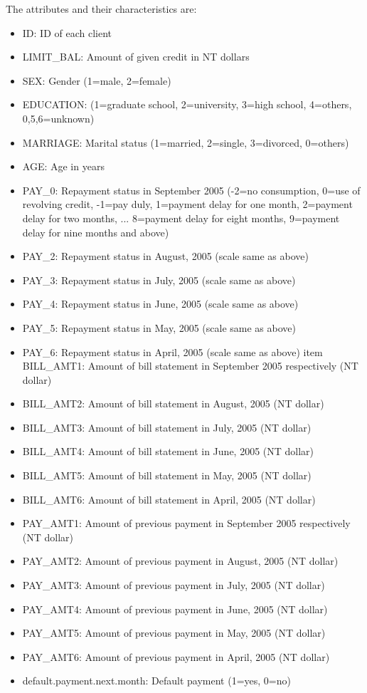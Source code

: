 \documentclass[fleqn,10pt]{SelfArx} %
\begin{document}
	The attributes and their characteristics are:
	\begin{itemize}[noitemsep]
		\item ID: ID of each client
		\item LIMIT\_BAL: Amount of given credit in NT dollars
		\item SEX: Gender (1=male, 2=female)
		\item EDUCATION: (1=graduate school, 2=university, 3=high school, 4=others, 0,5,6=unknown)
		\item MARRIAGE: Marital status (1=married, 2=single, 3=divorced, 0=others)
		\item AGE: Age in years
		\item PAY\_0: Repayment status in September 2005 (-2=no consumption, 0=use of revolving credit, -1=pay duly, 1=payment delay for one month, 2=payment delay for two months, ... 8=payment delay for eight months, 9=payment delay for nine months and above)
		\item PAY\_2: Repayment status in August, 2005 (scale same as above)
		\item PAY\_3: Repayment status in July, 2005 (scale same as above)
		\item PAY\_4: Repayment status in June, 2005 (scale same as above)
		\item PAY\_5: Repayment status in May, 2005 (scale same as above)
		\item PAY\_6: Repayment status in April, 2005 (scale same as above)
		item BILL\_AMT1: Amount of bill statement in September 2005 respectively (NT dollar)
		\item BILL\_AMT2: Amount of bill statement in August, 2005 (NT dollar)
		\item BILL\_AMT3: Amount of bill statement in July, 2005 (NT dollar)
		\item BILL\_AMT4: Amount of bill statement in June, 2005 (NT dollar)
		\item BILL\_AMT5: Amount of bill statement in May, 2005 (NT dollar)
		\item BILL\_AMT6: Amount of bill statement in April, 2005 (NT dollar)
		\item PAY\_AMT1: Amount of previous payment in September 2005 respectively (NT dollar)
		\item PAY\_AMT2: Amount of previous payment in August, 2005 (NT dollar)
		\item PAY\_AMT3: Amount of previous payment in July, 2005 (NT dollar)
		\item PAY\_AMT4: Amount of previous payment in June, 2005 (NT dollar)
		\item PAY\_AMT5: Amount of previous payment in May, 2005 (NT dollar)
		\item PAY\_AMT6: Amount of previous payment in April, 2005 (NT dollar)
		\item default.payment.next.month: Default payment (1=yes, 0=no)
	\end{itemize}
	
\end{document}

